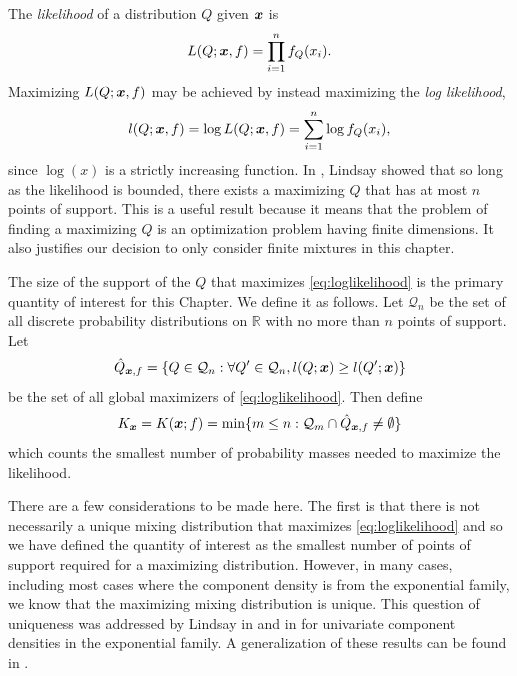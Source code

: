 	The \emph{likelihood} of a distribution $Q$ given ${\bm{{x}}}$ is 
	\begin{equation}
		L(Q;{\bm{{x}}}, f) = \prod_{i = 1}^n f_Q(x_i).
	\end{equation}
	Maximizing $L(Q;{\bm{{x}}}, f)$ may be achieved by instead maximizing the \emph{log likelihood},
	\begin{equation}
		l(Q; {\bm{{x}}}, f) = \log L(Q; {\bm{{x}}}, f) = \sum_{i = 1}^n \log f_Q(x_i),
		\label{eq:loglikelihood}
	\end{equation}
	since $\log(x)$ is a strictly increasing function. In \cite{Lindsay1983-tf}, Lindsay showed that so long as the likelihood is bounded, there exists a maximizing $Q$ that has at most $n$ points of support. This is a useful result because it means that the problem of finding a maximizing $Q$ is an optimization problem having finite dimensions. It also justifies our decision to only consider finite mixtures in this chapter.

	The size of the support of the $Q$ that maximizes \eqref{eq:loglikelihood} is the primary quantity of interest for this Chapter. We define it as follows. Let $\mathcal{Q}_n$ be the set of all discrete probability distributions on $\mathbb{R}$ with no more than $n$ points of support. Let
	\begin{equation}
		\hat{Q}_{{\bm{{x}}},f} = \{Q \in \mathcal{Q}_n: \forall Q' \in \mathcal{Q}_n, l(Q;{\bm{{x}}}) \geq l(Q';{\bm{{x}}})\}
	\end{equation}
	be the set of all global maximizers of \eqref{eq:loglikelihood}. Then define
	\begin{equation}
		K_{\bm{{x}}} = K({\bm{{x}}}; f) = \min\{m \leq n : \mathcal{Q}_m \cap \hat{Q}_{{\bm{{x}}},f} \neq \emptyset\}
	\end{equation}
	which counts the smallest number of probability masses needed to maximize the likelihood.


	There are a few considerations to be made here. The first is that there is not necessarily a unique mixing distribution that maximizes \eqref{eq:loglikelihood} and so we have defined the quantity of interest as the smallest number of points of support required for a maximizing distribution. However, in many cases, including most cases where the component density is from the exponential family, we know that the maximizing mixing distribution is unique. This question of uniqueness was addressed by Lindsay in \cite{Lindsay1983-tf} and in \cite{Lindsay1983a-he} for univariate component densities in the exponential family. A generalization of these results can be found in \cite{Lindsay1993-rj}.

